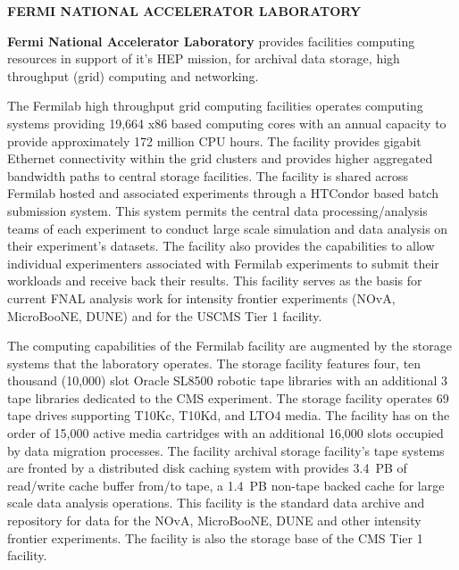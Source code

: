 





\begin{center}
{\sc \bf FERMI NATIONAL ACCELERATOR LABORATORY}\\
\end{center}

{\bf Fermi National Accelerator Laboratory} provides facilities computing resources in support of it's HEP mission, for archival data storage, high throughput (grid) computing and networking.  

The Fermilab high throughput grid computing facilities operates computing systems providing 19,664 x86 based computing cores with an annual capacity to provide approximately 172 million CPU hours.  The facility provides gigabit Ethernet connectivity within the grid clusters and provides higher aggregated bandwidth paths to central storage facilities.   The facility is shared across Fermilab hosted and associated experiments through a HTCondor based batch submission system.  This system permits the central data processing/analysis teams of each experiment to conduct large scale simulation and data analysis on their experiment's datasets.  The facility also provides the capabilities to allow individual experimenters associated with Fermilab experiments to submit their workloads and receive back their results.  This facility serves as the basis for current FNAL analysis work for intensity frontier experiments (NOvA, MicroBooNE, DUNE) and for the USCMS Tier 1 facility.

The computing capabilities of the Fermilab facility are augmented by the storage systems that the laboratory operates.  The storage facility features four, ten thousand (10,000) slot Oracle SL8500 robotic tape libraries with an additional 3 tape libraries dedicated to the CMS experiment.  The storage facility operates 69 tape drives supporting T10Kc, T10Kd, and LTO4 media.  The facility has on the order of 15,000 active media cartridges with an additional 16,000 slots occupied by data migration processes. The facility archival storage facility's tape systems are fronted by a distributed disk caching system with provides 3.4~PB of read/write cache buffer from/to tape, a 1.4~PB non-tape backed cache for large scale data analysis operations.  This facility is the standard data archive and repository for data for the NOvA, MicroBooNE, DUNE and other intensity frontier experiments.  The facility is also the storage base of the CMS Tier 1 facility. 

